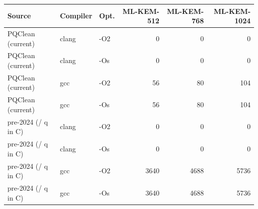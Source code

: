 \begin{tabular}{lllrrr}\toprule
Source & Compiler & Opt. & ML-KEM-512 & ML-KEM-768 & ML-KEM-1024 \\\midrule
PQClean (current) & clang & -O2 & 0 & 0 & 0 \\
PQClean (current) & clang & -Os & 0 & 0 & 0 \\
PQClean (current) & gcc & -O2 & 56 & 80 & 104 \\
PQClean (current) & gcc & -Os & 56 & 80 & 104 \\
pre-2024 (/ q in C) & clang & -O2 & 0 & 0 & 0 \\
pre-2024 (/ q in C) & clang & -Os & 0 & 0 & 0 \\
pre-2024 (/ q in C) & gcc & -O2 & 3640 & 4688 & 5736 \\
pre-2024 (/ q in C) & gcc & -Os & 3640 & 4688 & 5736 \\
\bottomrule
\end{tabular}
